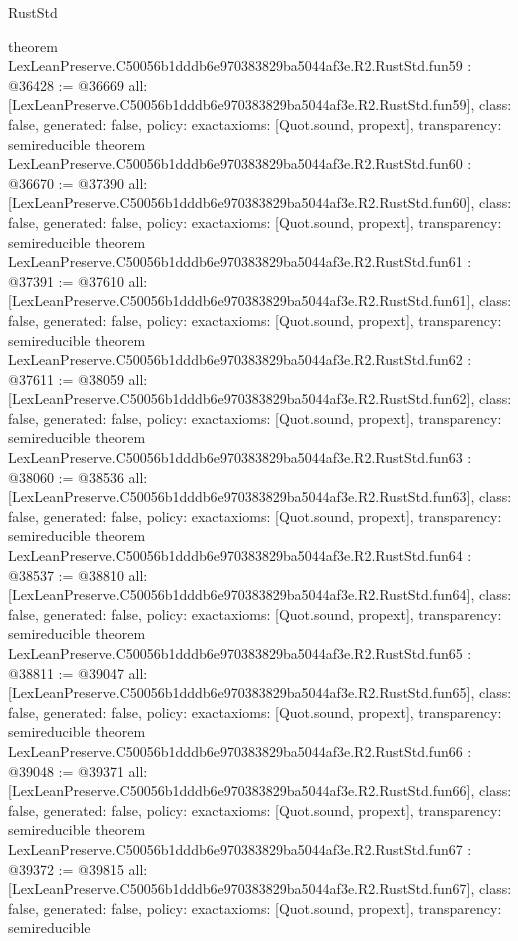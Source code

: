 \begin{lexlean}{RustStd}
\begin{coremodule}
{}
theorem LexLeanPreserve.C50056b1dddb6e970383829ba5044af3e.R2.RustStd.fun59 : @36428 := @36669 {
  all: [LexLeanPreserve.C50056b1dddb6e970383829ba5044af3e.R2.RustStd.fun59],
  class: false,
  generated: false,
  policy: exact{axioms: [Quot.sound, propext]},
  transparency: semireducible
}
theorem LexLeanPreserve.C50056b1dddb6e970383829ba5044af3e.R2.RustStd.fun60 : @36670 := @37390 {
  all: [LexLeanPreserve.C50056b1dddb6e970383829ba5044af3e.R2.RustStd.fun60],
  class: false,
  generated: false,
  policy: exact{axioms: [Quot.sound, propext]},
  transparency: semireducible
}
theorem LexLeanPreserve.C50056b1dddb6e970383829ba5044af3e.R2.RustStd.fun61 : @37391 := @37610 {
  all: [LexLeanPreserve.C50056b1dddb6e970383829ba5044af3e.R2.RustStd.fun61],
  class: false,
  generated: false,
  policy: exact{axioms: [Quot.sound, propext]},
  transparency: semireducible
}
theorem LexLeanPreserve.C50056b1dddb6e970383829ba5044af3e.R2.RustStd.fun62 : @37611 := @38059 {
  all: [LexLeanPreserve.C50056b1dddb6e970383829ba5044af3e.R2.RustStd.fun62],
  class: false,
  generated: false,
  policy: exact{axioms: [Quot.sound, propext]},
  transparency: semireducible
}
theorem LexLeanPreserve.C50056b1dddb6e970383829ba5044af3e.R2.RustStd.fun63 : @38060 := @38536 {
  all: [LexLeanPreserve.C50056b1dddb6e970383829ba5044af3e.R2.RustStd.fun63],
  class: false,
  generated: false,
  policy: exact{axioms: [Quot.sound, propext]},
  transparency: semireducible
}
theorem LexLeanPreserve.C50056b1dddb6e970383829ba5044af3e.R2.RustStd.fun64 : @38537 := @38810 {
  all: [LexLeanPreserve.C50056b1dddb6e970383829ba5044af3e.R2.RustStd.fun64],
  class: false,
  generated: false,
  policy: exact{axioms: [Quot.sound, propext]},
  transparency: semireducible
}
theorem LexLeanPreserve.C50056b1dddb6e970383829ba5044af3e.R2.RustStd.fun65 : @38811 := @39047 {
  all: [LexLeanPreserve.C50056b1dddb6e970383829ba5044af3e.R2.RustStd.fun65],
  class: false,
  generated: false,
  policy: exact{axioms: [Quot.sound, propext]},
  transparency: semireducible
}
theorem LexLeanPreserve.C50056b1dddb6e970383829ba5044af3e.R2.RustStd.fun66 : @39048 := @39371 {
  all: [LexLeanPreserve.C50056b1dddb6e970383829ba5044af3e.R2.RustStd.fun66],
  class: false,
  generated: false,
  policy: exact{axioms: [Quot.sound, propext]},
  transparency: semireducible
}
theorem LexLeanPreserve.C50056b1dddb6e970383829ba5044af3e.R2.RustStd.fun67 : @39372 := @39815 {
  all: [LexLeanPreserve.C50056b1dddb6e970383829ba5044af3e.R2.RustStd.fun67],
  class: false,
  generated: false,
  policy: exact{axioms: [Quot.sound, propext]},
  transparency: semireducible
}
\end{coremodule}
\end{lexlean}

